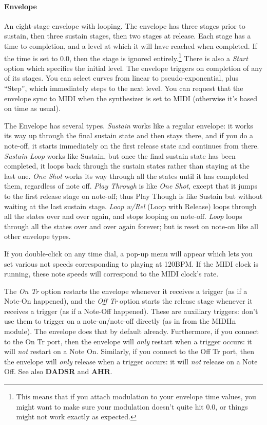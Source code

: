 \documentclass{article}
\begin{document}
\paragraph{Envelope}  An eight-stage envelope with looping.  The envelope has three stages prior to sustain, then three sustain stages, then two stages at release.  Each stage has a time to completion, and a level at which it will have reached when completed.  If the time is set to 0.0, then the stage is ignored entirely.\footnote{This means that if you attach modulation to your envelope time values, you might want to make sure your modulation doesn't quite hit 0.0, or things might not work exactly as expected.}  There is also a {\it Start} option which specifies the initial level.  The envelope triggers on completion of any of its stages.  You can select curves from linear to pseudo-exponential, plus ``Step'', which immediately steps to the next level.  You can request that the envelope sync to MIDI when the synthesizer is set to MIDI (otherwise it's based on time as usual). 

The Envelope has several types.  {\it Sustain} works like a regular envelope: it works its way up through the final sustain state and then stays there, and if you do a note-off, it starts immediately on the first release state and continues from there.  {\it Sustain Loop} works like Sustain, but once the final sustain state has been completed, it loops back through the sustain states rather than staying at the last one.  {\it One Shot} works its way through all the states until  it has completed them, regardless of note off.  {\it Play Through} is like {\it One Shot}, except that it jumps to the first release stage on note-off; thus Play Though is like Sustain but without waiting at the last sustain stage.  {\it Loop w/Rel} (Loop with Release) loops through all the states over and over again, and stops looping on note-off.  {\it Loop} loops through all the states over and over again forever; but is reset on note-on like all other envelope types.
   
If you double-click on any time dial, a pop-up menu will appear which lets you set various not speeds corresponding to playing at 120BPM.  If the MIDI clock is running, these note speeds will correspond to the MIDI clock's rate.

The {\it On Tr} option restarts the envelope whenever it receives a trigger (as if a Note-On happened), and the {\it Off Tr} option starts the release stage whenever it receives a trigger (as if a Note-Off happened).  These are auxiliary triggers: don't use them to trigger on a note-on/note-off directly (as in from the MIDIIn module).  The envelope does that by default already.  Furthermore, if you connect to the On Tr port, then the envelope will {\it only} restart when a trigger occurs: it will {\it not} restart on a Note On.  Similarly, if you connect to the Off Tr port, then the envelope will {\it only} release when a trigger occurs: it will {\it not} release on a Note Off.   See also {\bf DADSR} and {\bf AHR}.
\end{document}
